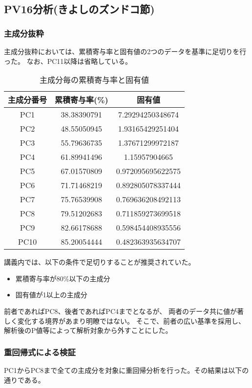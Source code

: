 \documentclass[11pt,a4paper, uplatex]{jsarticle}
\begin{document}
\subsection{PV16分析(きよしのズンドコ節)}
\subsubsection{主成分抜粋}
主成分抜粋においては、累積寄与率と固有値の2つのデータを基準に足切りを行った。
なお、PC11以降は省略している。

\begin{table}[htbp]
  \begin{center}
    \caption{主成分毎の累積寄与率と固有値}
    \begin{tabular}{c|c|c}
      \hline
      主成分番号 & 累積寄与率(\%) & 固有値 \\ \hline \hline
      PC1 & 38.38390791 & 7.29294250348674 \\
      PC2 & 48.55050945 & 1.93165429251404 \\
      PC3 & 55.79636735 & 1.37671299972187 \\
      PC4 & 61.89941496 & 1.15957904665 \\
      PC5 & 67.01570809 & 0.972095695622575 \\
      PC6 & 71.71468219 & 0.892805078337444 \\
      PC7 & 75.76539908 & 0.769636208492113 \\
      PC8 & 79.51202683 & 0.711859273699518 \\
      PC9 & 82.66178688 & 0.598454408935556 \\
      PC10 & 85.20054444 & 0.482363935634707 \\
      \hline
    \end{tabular}
  \end{center}
\end{table}

講義内では、以下の条件で足切りすることが推奨されていた。

\begin{itemize}
  \item 累積寄与率が80\%以下の主成分
  \item 固有値が1以上の主成分
\end{itemize}

前者であればPC8、後者であればPC4までとなるが、
両者のデータ共に値が著しく変化する境界があまり明瞭ではない。
そこで、前者の広い基準を採用し、解析後のP値等によって解析対象から外すことにした。

\subsubsection{重回帰式による検証}
PC1からPC8まで全ての主成分を対象に重回帰分析を行った。その結果は以下の通りである。
\end{document}

